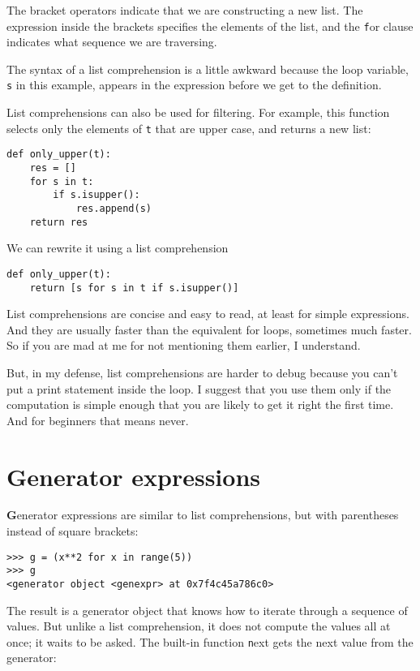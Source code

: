 \documentclass[
DIV=11,
fontsize=12,
twoside,
headinclude=false,
titlepage=firstiscover,
abstract=true,
headsepline=true,
footsepline=true,
chapterprefix=true, %
headings=big,
bibliography=totoc,%
captions=tableheading
]{scrbook}
\theoremstyle{definition}
\begin{document}
The bracket operators indicate that we are constructing a new
list.  The expression inside the brackets specifies the elements
of the list, and the {\texttt for} clause indicates what sequence
we are traversing.

The syntax of a list comprehension is a little awkward because
the loop variable, {\texttt s} in this example, appears in the expression
before we get to the definition.

List comprehensions can also be used for filtering.  For example,
this function selects only the elements of {\texttt t} that are
upper case, and returns a new list:

\begin{lstlisting}
def only_upper(t):
    res = []
    for s in t:
        if s.isupper():
            res.append(s)
    return res
\end{lstlisting}

We can rewrite it using a list comprehension

\begin{lstlisting}
def only_upper(t):
    return [s for s in t if s.isupper()]
\end{lstlisting}

List comprehensions are concise and easy to read, at least for simple
expressions.  And they are usually faster than the equivalent for
loops, sometimes much faster.  So if you are mad at me for not
mentioning them earlier, I understand.

But, in my defense, list comprehensions are harder to debug because
you can't put a print statement inside the loop.  I suggest that you
use them only if the computation is simple enough that you are likely
to get it right the first time.  And for beginners that means never.



\section{Generator expressions}

{\textbf Generator expressions} are similar to list comprehensions, but
with parentheses instead of square brackets:

\begin{lstlisting}
>>> g = (x**2 for x in range(5))
>>> g
<generator object <genexpr> at 0x7f4c45a786c0>
\end{lstlisting}
%
The result is a generator object that knows how to iterate through
a sequence of values.  But unlike a list comprehension, it does not
compute the values all at once; it waits to be asked.  The built-in
function {\texttt next} gets the next value from the generator:
\end{document}
